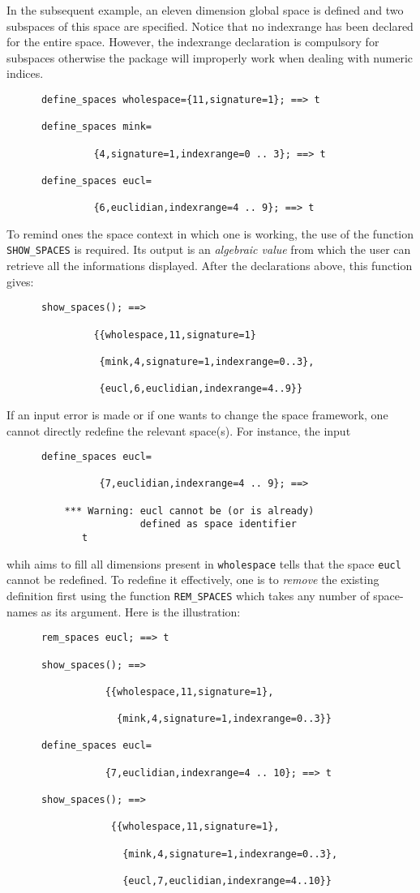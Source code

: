 In the subsequent example, an eleven dimension global space is defined
and two subspaces of this space are specified.
Notice that no indexrange has been declared for the entire space.
However, the indexrange declaration is compulsory for subspaces otherwise
the package will improperly work when dealing with numeric indices.
\begin{verbatim}
      define_spaces wholespace={11,signature=1}; ==> t

      define_spaces mink=

               {4,signature=1,indexrange=0 .. 3}; ==> t

      define_spaces eucl=

               {6,euclidian,indexrange=4 .. 9}; ==> t
\end{verbatim}
To remind ones the space context in which one is working, the use of the
function \texttt{SHOW\_SPACES} is required. Its output is an
\emph{algebraic value} from which the user can retrieve all the informations
displayed. After the declarations above, this function gives:
\begin{verbatim}
      show_spaces(); ==>

               {{wholespace,11,signature=1}

                {mink,4,signature=1,indexrange=0..3},

                {eucl,6,euclidian,indexrange=4..9}}
\end{verbatim}
If an input error is made  or if one wants to change the space framework, one
cannot directly redefine the relevant space(s). For instance, the input
\begin{verbatim}
      define_spaces eucl=

                {7,euclidian,indexrange=4 .. 9}; ==>

          *** Warning: eucl cannot be (or is already)
                       defined as space identifier
             t
\end{verbatim}
whih aims to fill all dimensions present in \texttt{wholespace}
tells that the space \texttt{eucl} cannot be redefined. To redefine it effectively,
one is  to \emph{remove} the existing definition first using the function
\texttt{REM\_SPACES} which takes any number of space-names as
its argument. Here is the illustration:
\begin{verbatim}
      rem_spaces eucl; ==> t

      show_spaces(); ==>

                 {{wholespace,11,signature=1},

                   {mink,4,signature=1,indexrange=0..3}}

      define_spaces eucl=

                 {7,euclidian,indexrange=4 .. 10}; ==> t

      show_spaces(); ==>

                  {{wholespace,11,signature=1},

                    {mink,4,signature=1,indexrange=0..3},

                    {eucl,7,euclidian,indexrange=4..10}}
\end{verbatim} 
